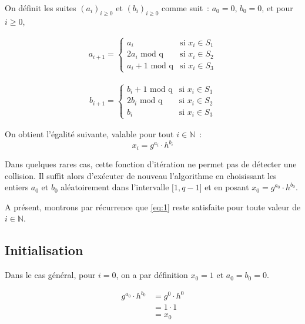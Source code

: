         On définit les suites ${(a_i)}_{i \geq 0}$ et ${(b_i)}_{i \geq 0}$ comme suit~: $a_0 = 0$, $b_0 = 0$, et pour $i \geq 0$,

        \begin{align*}
          a_{i+1} =
          \begin{cases}
            a_i                   & \text{si } x_i \in S_1 \\
            2a_i \text{\ mod q}    & \text{si } x_i \in S_2 \\
            a_i + 1 \text{\ mod q} & \text{si } x_i \in S_3
          \end{cases}
        \end{align*}

        \begin{align*}
          b_{i+1} =
          \begin{cases}
            b_i + 1 \text{\ mod q} & \text{si } x_i \in S_1 \\
            2b_i \text{\ mod q}    & \text{si } x_i \in S_2 \\
            b_i                   & \text{si } x_i \in S_3
          \end{cases}
        \end{align*}

        On obtient l'égalité suivante, valable pour tout $i \in \mathbb{N}$~:
        \begin{equation} \label{eq:1}
          x_i = g^{a_i} \cdot h^{b_i}
        \end{equation}

		Dans quelques rares cas, cette fonction d'itération ne permet pas de détecter une collision. Il suffit alors d'exécuter de nouveau l'algorithme en choisissant les entiers $a_0$ et $b_0$ aléatoirement dans l'intervalle $\mathopen{[}1,q-1\mathclose{]}$ et en posant $x_0 = g^{a_0} \cdot h^{b_0}$.

		A présent, montrons par récurrence que \eqref{eq:1} reste satisfaite pour toute valeur de $i \in \mathbb{N}$.

        \subsection*{Initialisation}

        Dans le cas général, pour $i = 0$, on a par définition $x_0 = 1$ et $a_0 = b_0 = 0$.

        \begin{align*}
          g^{a_0} \cdot h^{b_0} &= g^{0} \cdot h^{0} \\
                                &= 1 \cdot 1 \\
                                &= x_0
        \end{align*}


